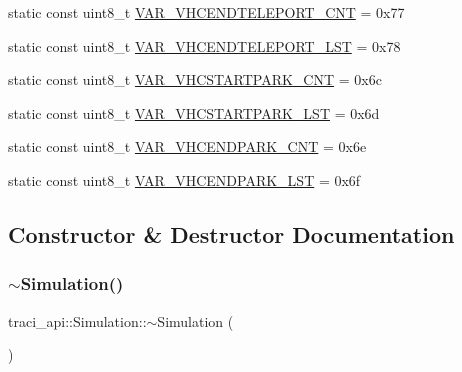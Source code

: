 \begin{DoxyCompactItemize}
\item 
static const uint8\+\_\+t \hyperlink{classtraci__api_1_1_simulation_a005529f94d02779594428533d622b5bd}{V\+A\+R\+\_\+\+V\+H\+C\+E\+N\+D\+T\+E\+L\+E\+P\+O\+R\+T\+\_\+\+C\+NT} = 0x77
\item 
static const uint8\+\_\+t \hyperlink{classtraci__api_1_1_simulation_a7662449bf431cf2c454d192f7b6c6bf8}{V\+A\+R\+\_\+\+V\+H\+C\+E\+N\+D\+T\+E\+L\+E\+P\+O\+R\+T\+\_\+\+L\+ST} = 0x78
\item 
static const uint8\+\_\+t \hyperlink{classtraci__api_1_1_simulation_afb8883f64f8a38cc0fab2ceb5ca19b12}{V\+A\+R\+\_\+\+V\+H\+C\+S\+T\+A\+R\+T\+P\+A\+R\+K\+\_\+\+C\+NT} = 0x6c
\item 
static const uint8\+\_\+t \hyperlink{classtraci__api_1_1_simulation_aa9a559c39436fc08695c37e9939d5ab4}{V\+A\+R\+\_\+\+V\+H\+C\+S\+T\+A\+R\+T\+P\+A\+R\+K\+\_\+\+L\+ST} = 0x6d
\item 
static const uint8\+\_\+t \hyperlink{classtraci__api_1_1_simulation_a6a63c336454d76895435d70b0119d2de}{V\+A\+R\+\_\+\+V\+H\+C\+E\+N\+D\+P\+A\+R\+K\+\_\+\+C\+NT} = 0x6e
\item 
static const uint8\+\_\+t \hyperlink{classtraci__api_1_1_simulation_ac9b1a6baea01106e4c283f9d8a3d40dc}{V\+A\+R\+\_\+\+V\+H\+C\+E\+N\+D\+P\+A\+R\+K\+\_\+\+L\+ST} = 0x6f
\end{DoxyCompactItemize}


\subsection{Constructor \& Destructor Documentation}
\mbox{\label{classtraci__api_1_1_simulation_af0680bb9b12ef4c4d47e45f3aeebc108}} 
\subsubsection{\texorpdfstring{$\sim$\+Simulation()}{~Simulation()}}
{\footnotesize\ttfamily traci\+\_\+api\+::\+Simulation\+::$\sim$\+Simulation (\begin{DoxyParamCaption}{ }\end{DoxyParamCaption})}

\mbox{\label{classtraci__api_1_1_simulation_a0e41f9a2911b8f3545002220027a9922}} 

